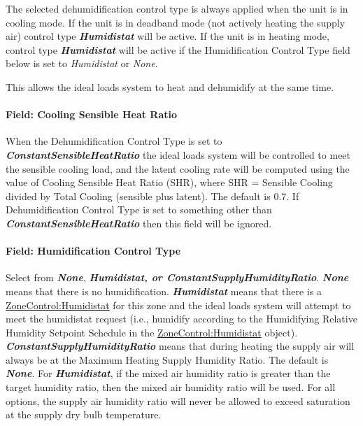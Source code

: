 The selected dehumidification control type is always applied when the unit is in cooling mode. If the unit is in deadband mode (not actively heating the supply air) control type \textbf{\emph{Humidistat}} will be active. If the unit is in heating mode, control type \textbf{\emph{Humidistat}} will be active if the Humidification Control Type field below is set to \emph{Humidistat} or \emph{None}.

This allows the ideal loads system to heat and dehumidify at the same time.

\paragraph{Field: Cooling Sensible Heat Ratio}\label{field-cooling-sensible-heat-ratio-000}

When the Dehumidification Control Type is set to \textbf{\emph{ConstantSensibleHeatRatio}} the ideal loads system will be controlled to meet the sensible cooling load, and the latent cooling rate will be computed using the value of Cooling Sensible Heat Ratio (SHR), where SHR = Sensible Cooling divided by Total Cooling (sensible plus latent). The default is 0.7. If Dehumidification Control Type is set to something other than \textbf{\emph{ConstantSensibleHeatRatio}} then this field will be ignored.

\paragraph{Field: Humidification Control Type}\label{field-humidification-control-type-000}

Select from \textbf{\emph{None}}, \textbf{\emph{Humidistat, or ConstantSupplyHumidityRatio}}. \textbf{\emph{None}} means that there is no humidification. \textbf{\emph{Humidistat}} means that there is a \hyperref[zonecontrolhumidistat]{ZoneControl:Humidistat} for this zone and the ideal loads system will attempt to meet the humidistat request (i.e., humidify according to the Humidifying Relative Humidity Setpoint Schedule in the \hyperref[zonecontrolhumidistat]{ZoneControl:Humidistat} object).   \textbf{\emph{ConstantSupplyHumidityRatio}} means that during heating the supply air will always be at the Maximum Heating Supply Humidity Ratio. The default is \textbf{\emph{None}}. For \textbf{\emph{Humidistat}}, if the mixed air humidity ratio is greater than the target humidity ratio, then the mixed air humidity ratio will be used. For all options, the supply air humidity ratio will never be allowed to exceed saturation at the supply dry bulb temperature.

